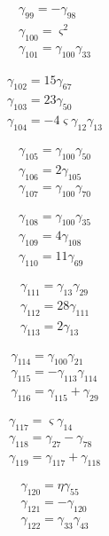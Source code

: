 \[\begin{aligned}\gamma_{99}=- \gamma_{98}\\ \gamma_{100}=\varsigma ^{2}\\ \gamma_{101}=\gamma_{100} \gamma_{33}\end{aligned}\]

\[\begin{aligned}\gamma_{102}=15 \gamma_{67}\\ \gamma_{103}=23 \gamma_{50}\\ \gamma_{104}=- 4 \varsigma  \gamma_{12} \gamma_{13}\end{aligned}\]

\[\begin{aligned}\gamma_{105}=\gamma_{100} \gamma_{50}\\ \gamma_{106}=2 \gamma_{105}\\ \gamma_{107}=\gamma_{100} \gamma_{70}\end{aligned}\]

\[\begin{aligned}\gamma_{108}=\gamma_{100} \gamma_{35}\\ \gamma_{109}=4 \gamma_{108}\\ \gamma_{110}=11 \gamma_{69}\end{aligned}\]

\[\begin{aligned}\gamma_{111}=\gamma_{13} \gamma_{29}\\ \gamma_{112}=28 \gamma_{111}\\ \gamma_{113}=2 \gamma_{13}\end{aligned}\]

\[\begin{aligned}\gamma_{114}=\gamma_{100} \gamma_{21}\\ \gamma_{115}=- \gamma_{113} \gamma_{114}\\ \gamma_{116}=\gamma_{115} + \gamma_{29}\end{aligned}\]

\[\begin{aligned}\gamma_{117}=\varsigma  \gamma_{14}\\ \gamma_{118}=\gamma_{27} - \gamma_{78}\\ \gamma_{119}=\gamma_{117} + \gamma_{118}\end{aligned}\]

\[\begin{aligned}\gamma_{120}=\eta  \gamma_{55}\\ \gamma_{121}=- \gamma_{120}\\ \gamma_{122}=\gamma_{33} \gamma_{43}\end{aligned}\]

